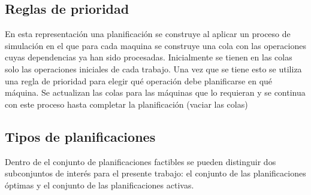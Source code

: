 \subsection*{Reglas de prioridad}
En esta representación una planificación se construye al aplicar un proceso de simulación en el que para cada maquina se construye una cola con las operaciones cuyas dependencias ya han sido procesadas. Inicialmente se tienen en las colas solo las operaciones iniciales de cada trabajo. Una vez que se tiene esto se utiliza una regla de prioridad para elegir qué operación debe planificarse en qué máquina. Se actualizan las colas para las máquinas que lo requieran y se continua con este proceso hasta completar la planificación (vaciar las colas)

\subsection*{Tipos de planificaciones}
Dentro de el conjunto de planificaciones factibles se pueden distinguir dos subconjuntos de interés para el presente trabajo: el conjunto de las planificaciones óptimas y el conjunto de las planificaciones activas. 

